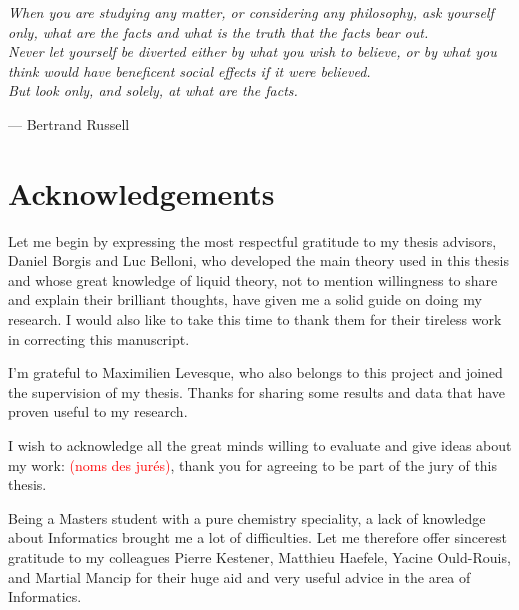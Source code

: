 
\begin{flushright}
\textsl{When you are studying any matter, or considering any philosophy,
ask yourself only, what are the facts and what is the truth that the
facts bear out.}\\
\textsl{ Never let yourself be diverted either by what you wish to
believe, or by what you think would have beneficent social effects
if it were believed.}\\
\textsl{ But look only, and solely, at what are the facts.}
\par\end{flushright}

\begin{flushright}
--- Bertrand Russell 
\par\end{flushright}

\bigskip{}


\begingroup
\let\clearpage\relax
\let\cleardoublepage\relax 


\chapter*{Acknowledgements}

Let me begin by expressing the most respectful gratitude to my thesis
advisors, Daniel Borgis and Luc Belloni, who developed the main theory
used in this thesis and whose great knowledge of liquid theory, not to 
mention willingness to share and explain their brilliant thoughts, have 
given me a solid guide on doing my research. I would also like to take 
this time to thank them for their tireless work in correcting this manuscript.

I'm grateful to Maximilien Levesque, who also belongs to this
project and joined the supervision of my thesis. Thanks for sharing
some results and data that have proven useful to my research.

I wish to acknowledge all the great minds willing to evaluate
and give ideas about my work: \textcolor{red}{(noms des jurés)}, thank
you for agreeing to be part of the jury of this thesis.

Being a Masters student with a pure chemistry speciality, a lack
of knowledge about Informatics brought me a lot of difficulties. Let me therefore
offer sincerest gratitude to my colleagues Pierre
Kestener, Matthieu Haefele, Yacine Ould-Rouis, and Martial Mancip
for their huge aid and very useful advice in the area of Informatics.

